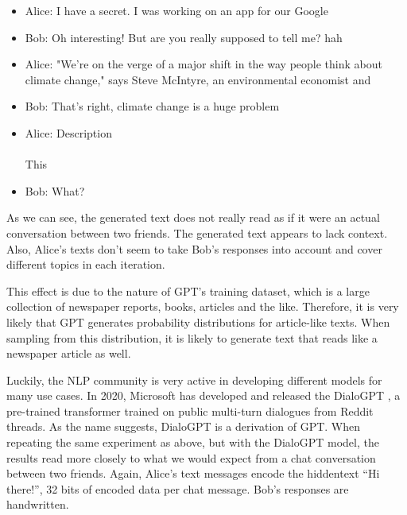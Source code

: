 \begin{example}
\leavevmode
\begin{itemize}
\item Alice: I have a secret. I was working on an app for our Google
\item Bob:   Oh interesting! But are you really supposed to tell me? hah
\item Alice: "We're on the verge of a major shift in the way people think about climate change," says Steve McIntyre, an environmental economist and
\item Bob:   That's right, climate change is a huge problem
\item Alice: Description \\
\\
       This
\item Bob:   What?
\end{itemize}
\end{example}

As we can see, the generated text does not really read as if it were an actual conversation between two friends.
The generated text appears to lack context.
Also, Alice's texts don't seem to take Bob's responses into account and cover different topics in each iteration.

This effect is due to the nature of GPT's training dataset, which is a large collection of newspaper reports, books, articles and the like.
Therefore, it is very likely that GPT generates probability distributions for article-like texts.
When sampling from this distribution, it is likely to generate text that reads like a newspaper article as well.

Luckily, the NLP community is very active in developing different models for many use cases.
In 2020, Microsoft has developed and released the DialoGPT \cite{Zhang2020}, a pre-trained transformer trained on public multi-turn dialogues from Reddit threads.
As the name suggests, DialoGPT is a derivation of GPT.
When repeating the same experiment as above, but with the DialoGPT model, the results read more closely to what we would expect from a chat conversation between two friends.
Again, Alice's text messages encode the hiddentext ``Hi there!'', 32 bits of encoded data per chat message.
Bob's responses are handwritten.

